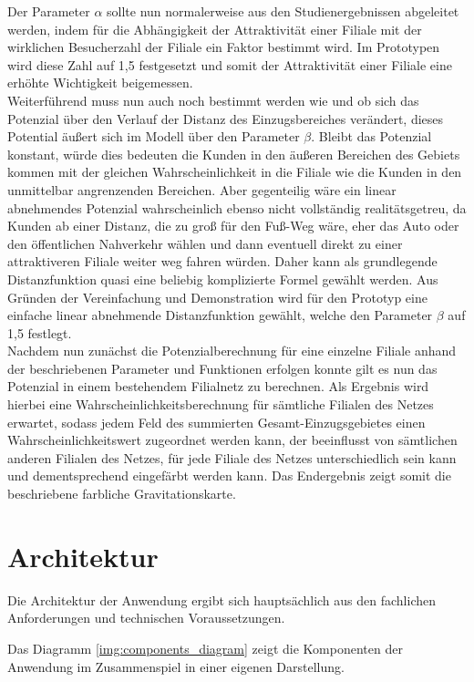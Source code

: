 Der Parameter $\alpha$ sollte nun normalerweise aus den Studienergebnissen abgeleitet werden, indem für die Abhängigkeit der Attraktivität einer Filiale mit der wirklichen Besucherzahl der Filiale ein Faktor bestimmt wird.
Im Prototypen wird diese Zahl auf 1,5 festgesetzt und somit der Attraktivität einer Filiale eine erhöhte Wichtigkeit beigemessen.\\
Weiterführend muss nun auch noch bestimmt werden wie und ob sich das Potenzial über den Verlauf der Distanz des Einzugsbereiches verändert, dieses Potential äußert sich im Modell über den Parameter $\beta$.
Bleibt das Potenzial konstant, würde dies bedeuten die Kunden in den äußeren Bereichen des Gebiets kommen mit der gleichen Wahrscheinlichkeit in die Filiale wie die Kunden in den unmittelbar angrenzenden Bereichen.
Aber gegenteilig wäre ein linear abnehmendes Potenzial wahrscheinlich ebenso nicht vollständig realitätsgetreu, da Kunden ab einer Distanz, die zu groß für den Fuß-Weg wäre, eher das Auto oder den öffentlichen Nahverkehr wählen und dann eventuell direkt zu einer attraktiveren Filiale weiter weg fahren würden. 
Daher kann als grundlegende Distanzfunktion quasi eine beliebig komplizierte Formel gewählt werden.
Aus Gründen der Vereinfachung und Demonstration wird für den Prototyp eine einfache linear abnehmende Distanzfunktion gewählt, welche den Parameter $\beta$ auf 1,5 festlegt.\\

Nachdem nun zunächst die Potenzialberechnung für eine einzelne Filiale anhand der beschriebenen Parameter und Funktionen erfolgen konnte gilt es nun das Potenzial in einem bestehendem Filialnetz zu berechnen.
Als Ergebnis wird hierbei eine Wahrscheinlichkeitsberechnung für sämtliche Filialen des Netzes erwartet, sodass jedem Feld des summierten Gesamt-Einzugsgebietes einen Wahrscheinlichkeitswert zugeordnet werden kann, der beeinflusst von sämtlichen anderen Filialen des Netzes, für jede Filiale des Netzes unterschiedlich sein kann und dementsprechend eingefärbt werden kann.
Das Endergebnis zeigt somit die beschriebene farbliche Gravitationskarte.

\section{Architektur}
Die Architektur der Anwendung ergibt sich hauptsächlich aus den fachlichen Anforderungen und technischen Voraussetzungen. 

Das Diagramm \ref{img:components_diagram} zeigt die Komponenten der Anwendung im Zusammenspiel in einer eigenen Darstellung.


